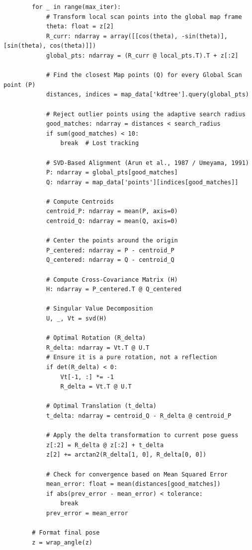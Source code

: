 \begin{verbatim}
        for _ in range(max_iter):
            # Transform local scan points into the global map frame
            theta: float = z[2]
            R_curr: ndarray = array([[cos(theta), -sin(theta)], [sin(theta), cos(theta)]])
            global_pts: ndarray = (R_curr @ local_pts.T).T + z[:2]

            # Find the closest Map points (Q) for every Global Scan point (P)
            distances, indices = map_data['kdtree'].query(global_pts)

            # Reject outlier points using the adaptive search radius
            good_matches: ndarray = distances < search_radius
            if sum(good_matches) < 10:
                break  # Lost tracking

            # SVD-Based Alignment (Arun et al., 1987 / Umeyama, 1991)
            P: ndarray = global_pts[good_matches]
            Q: ndarray = map_data['points'][indices[good_matches]]

            # Compute Centroids
            centroid_P: ndarray = mean(P, axis=0)
            centroid_Q: ndarray = mean(Q, axis=0)

            # Center the points around the origin
            P_centered: ndarray = P - centroid_P
            Q_centered: ndarray = Q - centroid_Q

            # Compute Cross-Covariance Matrix (H)
            H: ndarray = P_centered.T @ Q_centered

            # Singular Value Decomposition
            U, _, Vt = svd(H)

            # Optimal Rotation (R_delta)
            R_delta: ndarray = Vt.T @ U.T
            # Ensure it is a pure rotation, not a reflection
            if det(R_delta) < 0:
                Vt[-1, :] *= -1
                R_delta = Vt.T @ U.T

            # Optimal Translation (t_delta)
            t_delta: ndarray = centroid_Q - R_delta @ centroid_P

            # Apply the delta transformation to current pose guess
            z[:2] = R_delta @ z[:2] + t_delta
            z[2] += arctan2(R_delta[1, 0], R_delta[0, 0])

            # Check for convergence based on Mean Squared Error
            mean_error: float = mean(distances[good_matches])
            if abs(prev_error - mean_error) < tolerance:
                break
            prev_error = mean_error

        # Format final pose
        z = wrap_angle(z)


\end{verbatim}
